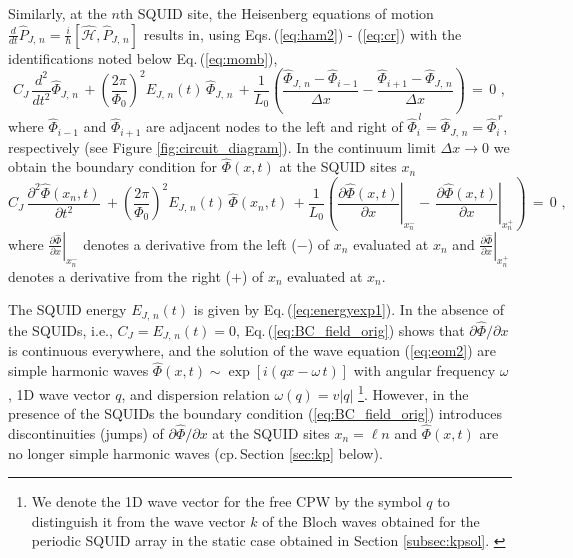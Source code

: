 Similarly, at the $n$th SQUID site, the Heisenberg equations of motion
$\displaystyle \frac{d}{dt} \hat{P}_{J,\,n} = \frac{i}{\hbar} \left[\hat{\mathcal{H}}, \hat{P}_{J,\,n} \right]$ 
results in, using Eqs.\,(\ref{eq:ham2}) - (\ref{eq:cr}) with the identifications noted below
Eq.\,(\ref{eq:momb}), 
%
\begin{equation}\label{eq:BC_discrete}
C_{J} \, \frac{d^2}{dt^2} \hat{\Phi}_{J,\,n} \, + \left(\frac{2 \pi}{\Phi_{0}} \right)^{2} E_{J,\,n}(t) \, \hat{\Phi}_{J, \, n}
\, + \frac{1}{L_{0}} 
\left( \frac{\hat{\Phi}_{J,\,n} - \hat{\Phi}_{i-1}}{\Delta x} - \frac{\hat{\Phi}_{i+1} - \hat{\Phi}_{J,\,n}}{\Delta x} \right)
\, = \, 0 \, \, ,
\end{equation}
%
where $\hat{\Phi}_{i-1}$ and $\hat{\Phi}_{i+1}$ are adjacent nodes to the left and right of 
$\hat{\Phi}_i^{\,l} = \hat{\Phi}_{J,\,n} = \hat{\Phi}_i^{\,r}$, respectively (see Figure \ref{fig:circuit_diagram}). 
In the continuum limit $\Delta x \to 0$ we obtain the boundary condition for $\hat{\Phi}(x, t)$ 
at the SQUID sites $x_n$
%
\begin{equation}\label{eq:BC_field_orig}
C_{J} \, \frac{\partial^2 \hat{\Phi}(x_n, t)}{\partial t^2} \, + 
\left(\frac{2 \pi}{\Phi_{0}}\right)^{2} E_{J,\,n}(t) \, \hat{\Phi}(x_n, t) \, + 
\frac{1}{L_{0}}\left(\left.\frac{\partial \hat{\Phi}(x, t)}{\partial x}\right|_{x_n^{-}}
- \, \left.\frac{\partial \hat{\Phi}(x,t)}{\partial x}\right|_{x_n^{+}}\right) \, = \, 0 \, \, ,
\end{equation}
%
where $\displaystyle \left.\frac{\partial \hat{\Phi}}{\partial x}\right|_{x_n^{-}}$
denotes a derivative from the left ($-$) of $x_n$ evaluated at $x_n$ and
$\displaystyle \left.\frac{\partial \hat{\Phi}}{\partial x}\right|_{x_n^{+}}$
denotes a derivative from the right ($+$) of $x_n$ evaluated at $x_n$. 

The SQUID energy $E_{J,\,n}(t)$ is given by Eq.\,(\ref{eq:energyexp1}). 
%
In the absence of the SQUIDs, i.e., $C_J = E_{J,\,n}(t) = 0$, 
Eq.\,(\ref{eq:BC_field_orig}) shows that $\partial \hat{\Phi} / \partial x$ is 
continuous everywhere, and the solution of the wave equation (\ref{eq:eom2})
are simple harmonic waves $\hat{\Phi}(x,t) \sim \exp\left[i (q x - \omega \, t) \right]$
with angular frequency $\omega$, 1D wave vector $q$, and dispersion relation 
$\omega(q) = v |q|$
%
\footnote{We denote the 1D wave vector for the free CPW by the symbol $q$ to distinguish it 
from the wave vector $k$ of the Bloch waves obtained for the periodic SQUID array in the static case
obtained in Section \ref{subsec:kpsol}. \label{footnote:q}}.
However, in the presence of the SQUIDs the boundary condition  
(\ref{eq:BC_field_orig}) introduces discontinuities (jumps) of $\partial \hat{\Phi} / \partial x$ 
at the SQUID sites $x_n = \ell n$ and $\hat{\Phi}(x,t)$ are no longer simple harmonic waves (cp.\,Section \ref{sec:kp} below).

